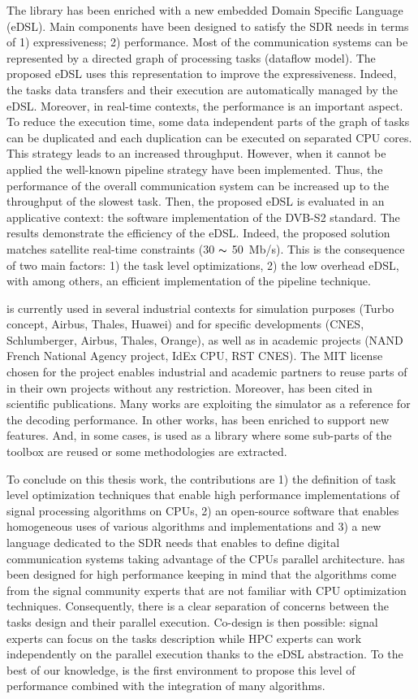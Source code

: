 The \AFFECT library has been enriched with a new embedded Domain Specific
Language (eDSL). Main components have been designed to satisfy the SDR needs in
terms of 1) expressiveness; 2) performance. Most of the communication systems
can be represented by a directed graph of processing tasks (dataflow model). The
proposed eDSL uses this representation to improve the expressiveness. Indeed,
the tasks data transfers and their execution are automatically managed by the
eDSL. Moreover, in real-time contexts, the performance is an important aspect.
To reduce the execution time, some data independent parts of the graph of tasks
can be duplicated and each duplication can be executed on separated CPU cores.
This strategy leads to an increased throughput. However, when it cannot be
applied the well-known pipeline strategy have been implemented. Thus, the
performance of the overall communication system can be increased up to the
throughput of the slowest task. Then, the proposed eDSL is evaluated in an
applicative context: the software implementation of the DVB-S2 standard. The
results demonstrate the efficiency of the \AFFECT eDSL. Indeed, the proposed
solution matches satellite real-time constraints (30 $\thicksim$ 50~Mb/s). This
is the consequence of two main factors: 1) the task level optimizations, 2) the
low overhead eDSL, with among others, an efficient implementation of the
pipeline technique.

\AFFECT is currently used in several industrial contexts for simulation purposes
(Turbo concept, Airbus, Thales, Huawei) and for specific developments (CNES,
Schlumberger, Airbus, Thales, Orange), as well as in academic projects (NAND
French National Agency project, IdEx CPU, RST CNES). The MIT license chosen for
the project enables industrial and academic partners to reuse parts of \AFFECT
in their own projects without any restriction. Moreover, \AFFECT has been cited
in scientific publications. Many works are exploiting the \AFFECT simulator as a
reference for the decoding performance. In other works, \AFFECT has been
enriched to support new features. And, in some cases, \AFFECT is used as a
library where some sub-parts of the toolbox are reused or some methodologies are
extracted.

To conclude on this thesis work, the contributions are 1) the definition of task
level optimization techniques that enable high performance implementations of
signal processing algorithms on CPUs, 2) an open-source software that enables
homogeneous uses of various algorithms and implementations and 3) a new language
dedicated to the SDR needs that enables to define digital communication systems
taking advantage of the CPUs parallel architecture. \AFFECT has been designed
for high performance keeping in mind that the algorithms come from the signal
community experts that are not familiar with CPU optimization techniques.
Consequently, there is a clear separation of concerns between the tasks design
and their parallel execution. Co-design is then possible: signal experts can
focus on the tasks description while HPC experts can work independently on the
parallel execution thanks to the eDSL abstraction. To the best of our knowledge,
\AFFECT is the first environment to propose this level of performance combined
with the integration of many algorithms.

